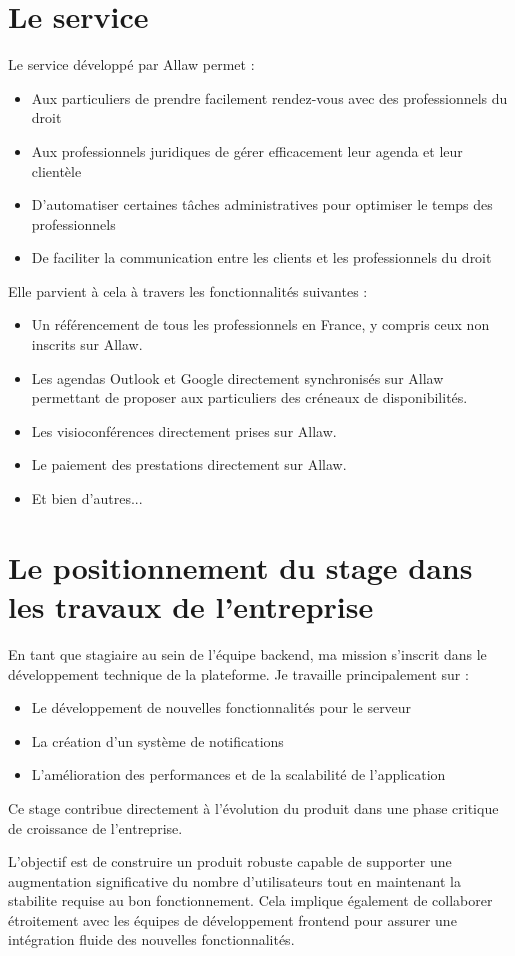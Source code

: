 \section{Le service}
Le service développé par Allaw permet :
\begin{itemize}
    \item Aux particuliers de prendre facilement rendez-vous avec des professionnels du droit
    \item Aux professionnels juridiques de gérer efficacement leur agenda et leur clientèle
    \item D'automatiser certaines tâches administratives pour optimiser le temps des professionnels
    \item De faciliter la communication entre les clients et les professionnels du droit
\end{itemize}

Elle parvient à cela à travers les fonctionnalités suivantes :

\begin{itemize}
    \item Un référencement de tous les professionnels en France, y compris ceux non inscrits sur Allaw.
    \item Les agendas Outlook et Google directement synchronisés sur Allaw permettant de proposer aux particuliers des créneaux de disponibilités.
    \item Les visioconférences directement prises sur Allaw.
    \item Le paiement des prestations directement sur Allaw.
    \item Et bien d'autres...
\end{itemize}

\section{Le positionnement du stage dans les travaux de l'entreprise} 
En tant que stagiaire au sein de l'équipe backend, ma mission s'inscrit dans le développement technique de la plateforme. Je travaille principalement sur :
\begin{itemize}
    \item Le développement de nouvelles fonctionnalités pour le serveur
    \item La création d'un système de notifications
    \item L'amélioration des performances et de la scalabilité de l'application
\end{itemize}
Ce stage contribue directement à l'évolution du produit dans une phase critique
de croissance de l'entreprise.

L'objectif est de construire un produit robuste capable de supporter une
augmentation significative du nombre d'utilisateurs tout en maintenant la
stabilite requise au bon fonctionnement. Cela implique également de collaborer
étroitement avec les équipes de développement frontend pour assurer une
intégration fluide des nouvelles fonctionnalités.

